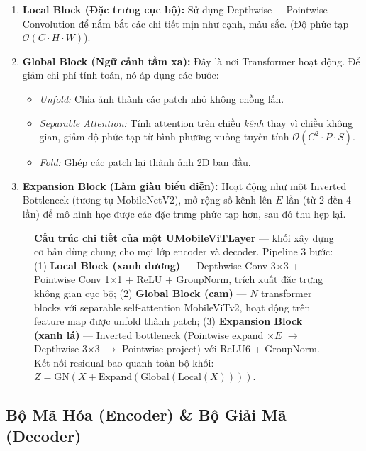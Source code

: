\documentclass[conference]{IEEEtran}
\begin{document}
\begin{enumerate}
    \item \textbf{Local Block (Đặc trưng cục bộ):} Sử dụng Depthwise + Pointwise Convolution để nắm bắt các chi tiết mịn như cạnh, màu sắc. (Độ phức tạp $\mathcal{O}(C \cdot H \cdot W)$).
    
    \item \textbf{Global Block (Ngữ cảnh tầm xa):} Đây là nơi Transformer hoạt động. Để giảm chi phí tính toán, nó áp dụng các bước:
    \begin{itemize}
        \item \textit{Unfold:} Chia ảnh thành các patch nhỏ không chồng lấn.
        \item \textit{Separable Attention:} Tính attention trên chiều \textit{kênh} thay vì chiều không gian, giảm độ phức tạp từ bình phương xuống tuyến tính $\mathcal{O}(C^2 \cdot P \cdot S)$.
        \item \textit{Fold:} Ghép các patch lại thành ảnh 2D ban đầu.
    \end{itemize}
    
    \item \textbf{Expansion Block (Làm giàu biểu diễn):} Hoạt động như một Inverted Bottleneck (tương tự MobileNetV2), mở rộng số kênh lên $E$ lần (từ 2 đến 4 lần) để mô hình học được các đặc trưng phức tạp hơn, sau đó thu hẹp lại.
\end{enumerate}

\begin{figure}[t]
\centering
{}
\caption{\textbf{Cấu trúc chi tiết của một UMobileViTLayer} --- khối xây dựng cơ bản dùng chung cho mọi lớp encoder và decoder. Pipeline 3 bước: (1) \textbf{Local Block (xanh dương)} --- Depthwise Conv 3$\times$3 + Pointwise Conv 1$\times$1 + ReLU + GroupNorm, trích xuất đặc trưng không gian cục bộ; (2) \textbf{Global Block (cam)} --- $N$ transformer blocks với separable self-attention MobileViTv2, hoạt động trên feature map được unfold thành patch; (3) \textbf{Expansion Block (xanh lá)} --- Inverted bottleneck (Pointwise expand $\times E$ $\rightarrow$ Depthwise 3$\times$3 $\rightarrow$ Pointwise project) với ReLU6 + GroupNorm. Kết nối residual bao quanh toàn bộ khối: $Z = \text{GN}(X + \text{Expand}(\text{Global}(\text{Local}(X))))$.}
\label{fig:umobilevit_layer}
\end{figure}

\subsection{Bộ Mã Hóa (Encoder) \& Bộ Giải Mã (Decoder)}
\end{document}
